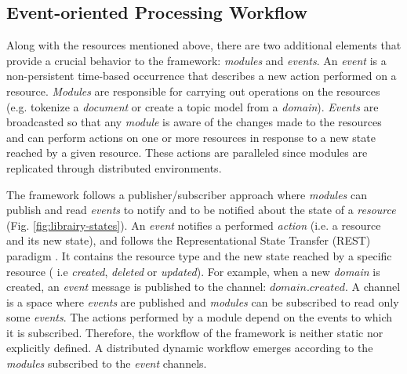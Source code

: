 \subsection{Event-oriented Processing Workflow}

Along with the resources mentioned above, there are two additional elements that provide a crucial behavior to the framework: \textit{modules} and \textit{events}. An \textit{event} is a non-persistent time-based occurrence that describes a new action performed on a resource. \textit{Modules} are responsible for carrying out operations on the resources (e.g. tokenize a \textit{document} or create a topic model from a \textit{domain}). \textit{Events} are broadcasted so that any \textit{module} is aware of the changes made to the resources and  can perform actions on one or more resources in response to a new state reached by a given resource. These actions are paralleled since modules are replicated through distributed environments.



The framework follows a publisher/subscriber approach where \textit{modules} can publish and read \textit{events} to notify and to be notified about the state of a \textit{resource} (Fig. \ref{fig:librairy-states}). An \textit{event} notifies a performed \textit{action} (i.e. a resource and its new state), and follows the Representational State Transfer (REST) paradigm \citep{Fielding2002}. It contains the resource type and the new state reached by a specific resource ( i.e \textit{created}, \textit{deleted} or \textit{updated}). For example, when a new \textit{domain} is created, an \textit{event} message is published to the channel: $domain.created$. A channel is a space where \textit{events} are published and \textit{modules} can be subscribed to read only some \textit{events}. The actions performed by a module depend on the events to which it is subscribed. Therefore, the workflow of the framework is neither static nor explicitly defined. A distributed dynamic workflow emerges according to the \textit{modules} subscribed to the \textit{event} channels.

